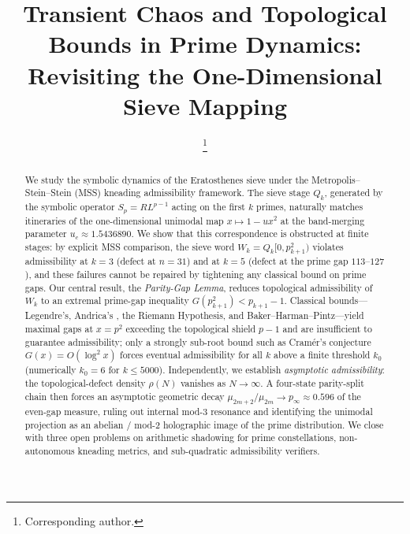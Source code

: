 \documentclass[cupthm,crop,info]{CUP-JNL-ETS}
\theoremstyle{cupplain}
\theoremstyle{cupdefinition}
\theoremstyle{cupremark}
\numberwithin{equation}{section}
\begin{document}
\begin{Frontmatter}

\title{Transient Chaos and Topological Bounds in Prime Dynamics:
Revisiting the One-Dimensional Sieve Mapping}

\author{ \thanks{Corresponding author.}}

\address{,
,
\\
()}


\maketitle


\begin{abstract}
We study the symbolic dynamics of the Eratosthenes sieve under the
Metropolis--Stein--Stein (MSS) kneading admissibility framework. The
sieve stage $Q_k$, generated by the symbolic operator $S_p = R L^{p-1}$
acting on the first $k$ primes, naturally matches itineraries of the
one-dimensional unimodal map $x \mapsto 1 - u x^2$ at the band-merging
parameter $u_c \approx 1.5436890$. We show that this correspondence is
obstructed at finite stages: by explicit MSS comparison, the sieve word
$W_k = Q_k[0, p_{k+1}^2)$ violates admissibility at $k = 3$ (defect at
$n = 31$) and at $k = 5$ (defect at the prime gap $113$--$127$), and
these failures cannot be repaired by tightening any classical bound on
prime gaps. Our central result, the \emph{Parity-Gap Lemma}, reduces
topological admissibility of $W_k$ to an extremal prime-gap inequality
$G(p_{k+1}^2) < p_{k+1} - 1$. Classical bounds---Legendre's, Andrica's
\cite{andrica1986conjecture}, the Riemann Hypothesis, and
Baker--Harman--Pintz---yield maximal gaps at $x = p^2$ exceeding the
topological shield $p - 1$ and are insufficient to guarantee
admissibility; only a strongly sub-root bound such as Cram\'er's
conjecture $G(x) = O(\log^2 x)$ forces eventual admissibility for all
$k$ above a finite threshold $k_0$ (numerically $k_0 = 6$ for
$k \leq 5000$). Independently, we establish \emph{asymptotic
admissibility}: the topological-defect density $\rho(N)$ vanishes as
$N \to \infty$. A four-state parity-split chain then forces an
asymptotic geometric decay $\mu_{2m+2}/\mu_{2m} \to p_\infty \approx 0.596$
of the even-gap measure, ruling out internal mod-3 resonance and
identifying the unimodal projection as an abelian / mod-2 holographic
image of the prime distribution. We close with three open problems on
arithmetic shadowing for prime constellations, non-autonomous kneading
metrics, and sub-quadratic admissibility verifiers.
\end{abstract}


\end{Frontmatter}
\end{document}
